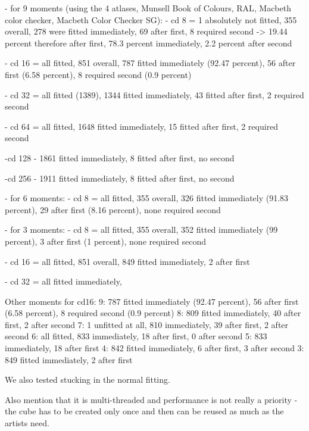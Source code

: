 - for 9 moments (using the 4 atlases, Munsell Book of Colours, RAL, Macbeth color checker, Macbeth Color Checker SG):
	- cd 8 = 1 absolutely not fitted, 355 overall, 278 were fitted immediately, 69 after first,
	8 required second -> 19.44 percent therefore after first, 78.3 percent immediately, 2.2 percent after second 
	
	- cd 16 = all fitted, 851 overall, 787 fitted immediately (92.47 percent), 56 after first (6.58 percent), 8 required second (0.9 percent)
	
	- cd 32 = all fitted (1389), 1344 fitted immediately, 43 fitted after first, 2 required second
	
	- cd 64 = all fitted, 1648 fitted immediately, 15 fitted after first, 2 required second
	 
	 -cd 128 - 1861 fitted immediately, 8 fitted after first, no second
	 
	 -cd 256 - 1911 fitted immediately, 8 fitted after first, no second 
	 
- for 6 moments:
	- cd 8 = all fitted, 355 overall, 326 fitted immediately (91.83 percent), 29 after first (8.16 percent), none required second
	
- for 3 moments:
	- cd 8 = all fitted, 355 overall, 352 fitted immediately (99 percent), 3 after first (1 percent), none required second 
	
	- cd 16 = all fitted, 851 overall, 849 fitted immediately, 2 after first
	
	- cd 32 = all fitted immediately, 

Other moments for cd16:
9: 787 fitted immediately (92.47 percent), 56 after first (6.58 percent), 8 required second (0.9 percent)
8: 809 fitted immediately, 40 after first, 2 after second
7: 1 unfitted at all, 810 immediately, 39 after first, 2 after second
6: all fitted, 833 immediately, 18 after first, 0 after second
5: 833 immediately, 18 after first
4: 842 fitted immediately, 6 after first, 3 after second
3: 849 fitted immediately, 2 after first

	
We also tested stucking in the normal fitting. 


Also mention that it is multi-threaded and performance is not really a priority - the cube has to be created only once and then can be reused as much as the artists need.
